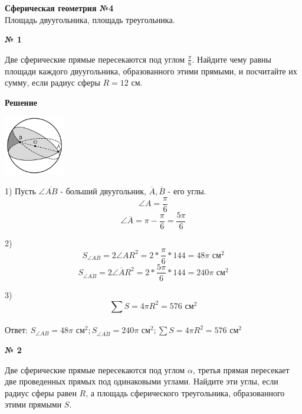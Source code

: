 


    \begin{center}
        \textbf{Сферическая геометрия №4}\\
        Площадь двуугольника, площадь треугольника.
    \end{center}

    \begin{center}
        \textbf{№ 1}
    \end{center}

    Две сферические прямые пересекаются под углом $\frac{\pi}{6}$.
    Найдите чему равны площади каждого двуугольника, образованного этими прямыми, и посчитайте их сумму,
    если радиус сферы $R=12$ см.

    \textbf{Решение}\\

    \begin{center}
        \includegraphics[width=0.2\textwidth]{images/img3}\\
    \end{center}


    1) Пусть $\angle \overline {AB}$ - больший двуугольник, $\overline A, \overline B$ - его углы.
    \[
        \angle A = \frac{\pi}{6}
    \]
    \[ \angle \overline A = \pi - \frac{\pi}{6} = \frac{5\pi}{6}\]

    2)
    \[
        S_{\angle AB} = 2\angle A R ^ 2 = 2 * \frac{\pi}{6} *  144 = 48\pi \text{ см}^2
    \]
    \[
        S_{\angle \overline{AB}} = 2\angle \overline A R ^ 2 = 2 * \frac{5\pi}{6} *  144 = 240\pi \text{ см}^2
    \]

    3)
    \[
        \sum S = 4\pi R ^ 2 = 576 \text{ см}^2
    \]\\

    Ответ: $S_{\angle AB} = 48\pi \text{ см}^2;  S_{\angle \overline{AB}} = 240\pi \text{ см}^2; \sum S = 4\pi R ^ 2 = 576 \text{ см}^2$

    \begin{center}
        \textbf{№ 2}
    \end{center}

    Две сферические прямые пересекаются под углом $\alpha$, третья прямая пересекает две проведенных прямых
    под одинаковыми углами.
    Найдите эти углы, если радиус сферы равен $R$, а площадь сферического треугольника, образованного этими прямыми $S$.

